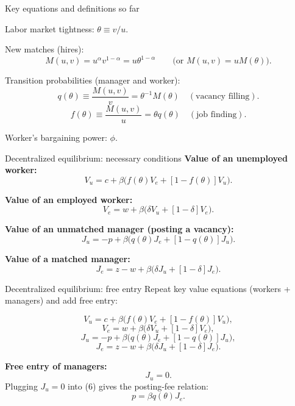 \documentclass[aspectratio=169,xcolor=dvipsnames]{beamer}
\let\tempone\itemize
\let\temptwo\enditemize
\renewenvironment{itemize}{\tempone\addtolength{\itemsep}{\fill}}{\temptwo}
\begin{document}
\begin{frame}{Key equations and definitions so far}
\label{slide:MP_31_SummaryDefs}
\small
\begin{itemize}
    \item Labor market tightness: \(\theta\equiv v/u\).
    \item New matches (hires):
    \[
        M(u,v)=u^\alpha v^{1-\alpha}=u\theta^{1-\alpha}
        \qquad \text{(or }M(u,v)=uM(\theta)\text{)}.
        \tag{1}
    \]
    \item Transition probabilities (manager and worker):
    \[
        q(\theta)\equiv \frac{M(u,v)}{v}=\theta^{-1}M(\theta)\quad (\text{vacancy filling}).
        \tag{2}
    \]
    \[
        f(\theta)\equiv \frac{M(u,v)}{u}=\theta q(\theta)\quad (\text{job finding}).
        \tag{3}
    \]
    \item Worker's bargaining power: \(\phi\).
\end{itemize}
\end{frame}



\begin{frame}{Decentralized equilibrium: necessary conditions}
\label{slide:MP_32_ValueEqns1}
\small
\textbf{Value of an unemployed worker:}
\[
V_u = c + \beta\Big(f(\theta)V_e + [1-f(\theta)]V_u\Big).
\tag{4}
\]

\textbf{Value of an employed worker:}
\[
V_e = w + \beta\Big(\delta V_u + [1-\delta]V_e\Big).
\tag{5}
\]

\textbf{Value of an unmatched manager (posting a vacancy):}
\[
J_u = -p + \beta\Big(q(\theta)J_e + [1-q(\theta)]J_u\Big).
\tag{6}
\]

\textbf{Value of a matched manager:}
\[
J_e = z-w + \beta\Big(\delta J_u + [1-\delta]J_e\Big).
\tag{7}
\]
\end{frame}

\begin{frame}{Decentralized equilibrium: free entry}
\label{slide:MP_33_FreeEntry}
\small
Repeat key value equations (workers + managers) and add free entry:

\[
V_u = c + \beta\Big(f(\theta)V_e + [1-f(\theta)]V_u\Big),\tag{4}
\]
\[
V_e = w + \beta\Big(\delta V_u + [1-\delta]V_e\Big),\tag{5}
\]
\[
J_u = -p + \beta\Big(q(\theta)J_e + [1-q(\theta)]J_u\Big),\tag{6}
\]
\[
J_e = z-w + \beta\Big(\delta J_u + [1-\delta]J_e\Big).\tag{7}
\]

\textbf{Free entry of managers:}
\[
J_u=0.
\tag{8}
\]
Plugging \(J_u=0\) into (6) gives the posting-fee relation:
\[
p=\beta q(\theta)J_e.
\tag{9}
\]
\end{frame}
\end{document}
